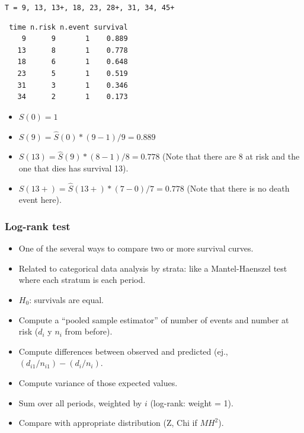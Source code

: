 \begin{frame}[fragile]
\frametitle{}

{\small \verb-T = 9, 13, 13+, 18, 23, 28+, 31, 34, 45+ -

\begin{verbatim}
 time n.risk n.event survival
    9      9       1    0.889
   13      8       1    0.778
   18      6       1    0.648
   23      5       1    0.519
   31      3       1    0.346
   34      2       1    0.173
\end{verbatim}
}


\begin{itemize}

\item $S(0) = 1$
\item $S(9) = \hat{S}(0) * (9 - 1)/9 = 0.889$
\item $S(13) = \hat{S}(9) * (8 - 1)/8 = 0.778$ (Note that there are 8 at
  risk and the one that dies has survival 13).
\item $S(13+) = \hat{S}(13+) * (7 - 0)/7 = 0.778$ (Note that there is no
  death event here).
\end{itemize}
\end{frame}


\begin{frame}
\frametitle{Log-rank test}
\begin{itemize}
\item One of the several ways to compare two or more survival curves.
\item Related to categorical data analysis by strata: like a
  Mantel-Haenszel test where each stratum is each period.
\item $H_0$: survivals are equal.
\item Compute a ``pooled sample estimator'' of number of events and number
  at risk  ($d_i$ y $n_i$ from before).
\item Compute differences between observed and predicted (ej.,
  $(d_{i1}/n_{i1}) - (d_{i}/n_{i})$.
\item Compute variance of those expected values.
\item Sum over all periods, weighted by $i$ (log-rank: weight
  = 1).
\item Compare with appropriate distribution (Z, Chi if $MH^2$).
\end{itemize}
\end{frame}


